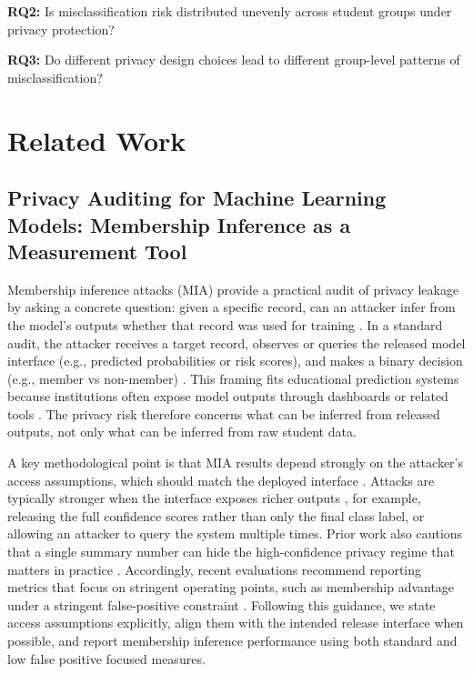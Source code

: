 \documentclass{edm_article}
\begin{document}
\textbf{RQ2:} Is misclassification risk distributed unevenly across student groups under privacy protection?

\textbf{RQ3:} Do different privacy design choices lead to different group-level patterns of misclassification?


\section{Related Work}

\subsection{Privacy Auditing for Machine Learning Models: Membership Inference as a Measurement Tool}

Membership inference attacks (MIA) provide a practical audit of privacy leakage by asking a concrete question: given a specific record, can an attacker infer from the model's outputs whether that record was used for training \cite{1shokri2017membership,4Yeom2017PrivacyRI}. In a standard audit, the attacker receives a target record, observes or queries the released model interface (e.g., predicted probabilities or risk scores), and makes a binary decision (e.g., member vs non-member) \cite{1shokri2017membership,2pollock2025free}. This framing fits educational prediction systems because institutions often expose model outputs through dashboards or related tools \cite{3plak2022_ews_dashboard}. The privacy risk therefore concerns what can be inferred from released outputs, not only what can be inferred from raw student data.

A key methodological point is that MIA results depend strongly on the attacker's access assumptions, which should match the deployed interface \cite{1shokri2017membership,5Salem2018MLLeaksMA}. Attacks are typically stronger when the interface exposes richer outputs \cite{1shokri2017membership}, for example, releasing the full confidence scores rather than only the final class label, or allowing an attacker to query the system multiple times. Prior work also cautions that a single summary number can hide the high-confidence privacy regime that matters in practice \cite{6Carlini9833649,33Aerni10.1145/3658644.3690194}. Accordingly, recent evaluations recommend reporting metrics that focus on stringent operating points, such as membership advantage under a stringent false-positive constraint \cite{2pollock2025free,4Yeom2017PrivacyRI,6Carlini9833649}. Following this guidance, we state access assumptions explicitly, align them with the intended release interface when possible, and report membership inference performance using both standard and low false positive focused measures.
\end{document}
